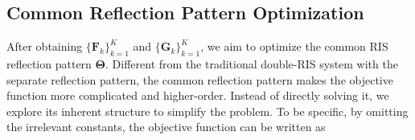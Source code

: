 \documentclass[journal]{IEEEtran}
\begin{document}
\subsection{ Common Reflection Pattern Optimization}


After obtaining $\{ {\mathbf{F}}_{k} \}_{k=1}^{K}$ and $\{ {\mathbf{G}}_{k} \}_{k=1}^{K}$, we aim to optimize the common RIS reflection pattern $\mathbf {\Theta}$. Different from the traditional double-RIS system with the separate reflection pattern, the common reflection pattern makes the objective function more complicated and higher-order. Instead of directly solving it, we explore its inherent structure to simplify the problem. To be specific, by omitting the irrelevant constants, the objective function can be written as 

\vspace{-5mm}
\end{document}
